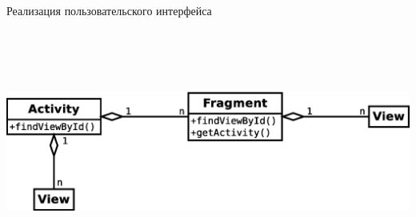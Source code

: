 \documentclass[russian,utf8,a1paper,nostitching,simple]{eskdgraph}
\begin{document}
\begin{ESKDdrawing}
  \centering
  {\fontsize{50}{60}\selectfont Реализация пользовательского интерфейса}

  \vspace{2cm}
  \begin{minipage}{45cm}
    \centering
     \\
    \vspace{2cm}
    \centering
    \includegraphics[height=7cm]{fig/implementation_ui_hierarchy.eps}


\end{minipage}
\end{ESKDdrawing}
\end{document}
